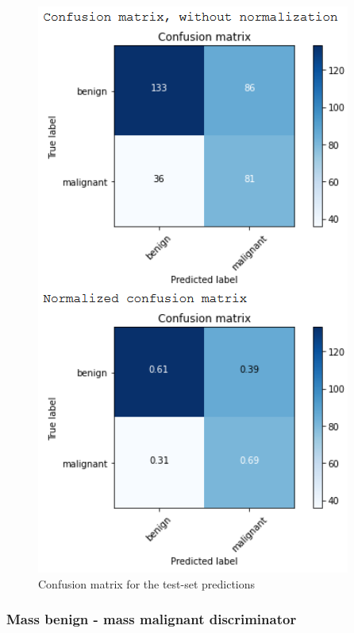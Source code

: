 \documentclass[11pt,a4paper,oneside]{article}
\begin{document}
\begin{figure}[h]
\begin{minipage}[c]{.4\textwidth}
		\includegraphics[width=.9\textwidth]{images/2.2/7_matrix}
		\caption{Confusion matrix for the test-set predictions}
		\label{fig:matrix_2.2_1_weights}
	\end{minipage}%
\end{figure}


\subsubsection{Mass benign - mass malignant discriminator}

\clearpage
\end{document}
